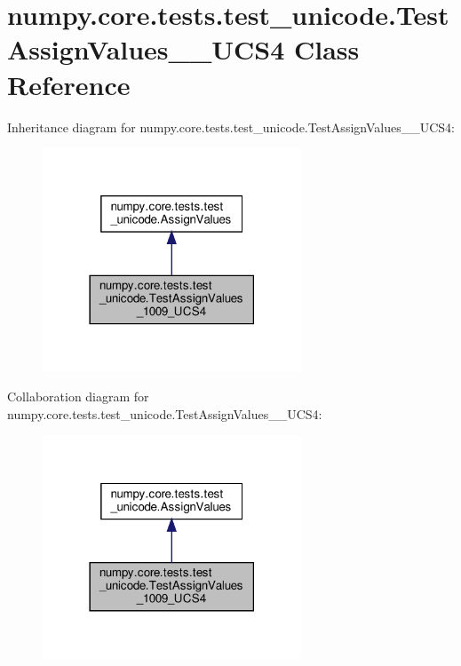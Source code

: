 \hypertarget{classnumpy_1_1core_1_1tests_1_1test__unicode_1_1TestAssignValues__1009__UCS4}{}\section{numpy.\+core.\+tests.\+test\+\_\+unicode.\+Test\+Assign\+Values\+\_\+\_\+\+U\+C\+S4 Class Reference}
\label{classnumpy_1_1core_1_1tests_1_1test__unicode_1_1TestAssignValues__1009__UCS4}


Inheritance diagram for numpy.\+core.\+tests.\+test\+\_\+unicode.\+Test\+Assign\+Values\+\_\+\_\+\+U\+C\+S4\+:
\nopagebreak
\begin{figure}[H]
\begin{center}
\leavevmode
\includegraphics[width=218pt]{classnumpy_1_1core_1_1tests_1_1test__unicode_1_1TestAssignValues__1009__UCS4__inherit__graph}
\end{center}
\end{figure}


Collaboration diagram for numpy.\+core.\+tests.\+test\+\_\+unicode.\+Test\+Assign\+Values\+\_\+\_\+\+U\+C\+S4\+:
\nopagebreak
\begin{figure}[H]
\begin{center}
\leavevmode
\includegraphics[width=218pt]{classnumpy_1_1core_1_1tests_1_1test__unicode_1_1TestAssignValues__1009__UCS4__coll__graph}
\end{center}
\end{figure}
